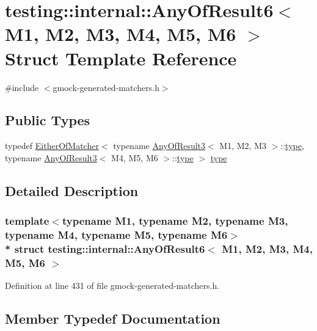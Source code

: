 \hypertarget{structtesting_1_1internal_1_1_any_of_result6}{}\section{testing\+:\+:internal\+:\+:Any\+Of\+Result6$<$ M1, M2, M3, M4, M5, M6 $>$ Struct Template Reference}
\label{structtesting_1_1internal_1_1_any_of_result6}


{\ttfamily \#include $<$gmock-\/generated-\/matchers.\+h$>$}

\subsection*{Public Types}
\begin{DoxyCompactItemize}
\item 
typedef \hyperlink{classtesting_1_1internal_1_1_either_of_matcher}{Either\+Of\+Matcher}$<$ typename \hyperlink{structtesting_1_1internal_1_1_any_of_result3}{Any\+Of\+Result3}$<$ M1, M2, M3 $>$\+::\hyperlink{structtesting_1_1internal_1_1_any_of_result6_a15837eb05d9ac5a76c20d344a4988dd1}{type}, typename \hyperlink{structtesting_1_1internal_1_1_any_of_result3}{Any\+Of\+Result3}$<$ M4, M5, M6 $>$\+::\hyperlink{structtesting_1_1internal_1_1_any_of_result6_a15837eb05d9ac5a76c20d344a4988dd1}{type} $>$ \hyperlink{structtesting_1_1internal_1_1_any_of_result6_a15837eb05d9ac5a76c20d344a4988dd1}{type}
\end{DoxyCompactItemize}


\subsection{Detailed Description}
\subsubsection*{template$<$typename M1, typename M2, typename M3, typename M4, typename M5, typename M6$>$\\*
struct testing\+::internal\+::\+Any\+Of\+Result6$<$ M1, M2, M3, M4, M5, M6 $>$}



Definition at line 431 of file gmock-\/generated-\/matchers.\+h.



\subsection{Member Typedef Documentation}
